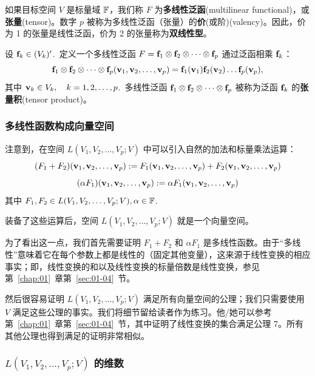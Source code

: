 如果目标空间 $V$ 是标量域 $\mathbb{F}$，我们称 $F$ 为\textbf{多线性泛函}(multilinear functional)，或\textbf{张量}(tensor)。数字 $p$ 被称为多线性泛函（张量）的\textbf{价}(或阶)(valency)。因此，价为 1 的张量是线性泛函，价为 2 的张量称为\textbf{双线性型}。

\begin{example*}
设 $\mathbf{f}_k \in (V_k)'$.~定义一个多线性泛函 $F = \mathbf{f}_1 \otimes \mathbf{f}_2 \otimes \dots \otimes \mathbf{f}_p$ 通过泛函相乘 $\mathbf{f}_k$：
\begin{equation}\label{eq:08-05-01}
\mathbf{f}_1 \otimes \mathbf{f}_2 \otimes \dots \otimes \mathbf{f}_p (\mathbf{v}_1, \mathbf{v}_2, \dots, \mathbf{v}_p) = \mathbf{f}_1(\mathbf{v}_1) \mathbf{f}_2(\mathbf{v}_2) \dots \mathbf{f}_p(\mathbf{v}_p),
\end{equation}
其中 $\mathbf{v}_k \in V_k,\quad k = 1, 2, \dots, p$.~多线性泛函 $\mathbf{f}_1 \otimes \mathbf{f}_2 \otimes \dots \otimes \mathbf{f}_p$ 被称为泛函 $\mathbf{f}_k$ 的\textbf{张量积}(tensor product)。
\end{example*}

\subsubsection{多线性函数构成向量空间}\label{sec:08-05-01-01}

注意到，在空间 $L(V_1, V_2, \dots, V_p; V)$ 中可以引入自然的加法和标量乘法运算：
$$ (F_1 + F_2)(\mathbf{v}_1, \mathbf{v}_2, \dots, \mathbf{v}_p) := F_1(\mathbf{v}_1, \mathbf{v}_2, \dots, \mathbf{v}_p) + F_2(\mathbf{v}_1, \mathbf{v}_2, \dots, \mathbf{v}_p) $$
$$ (\alpha F_1)(\mathbf{v}_1, \mathbf{v}_2, \dots, \mathbf{v}_p) := \alpha F_1(\mathbf{v}_1, \mathbf{v}_2, \dots, \mathbf{v}_p) $$
其中 $F_1, F_2 \in L(V_1, V_2, \dots, V_p; V), \alpha \in \mathbb{F}$.~

装备了这些运算后，空间 $L(V_1, V_2, \dots, V_p; V)$ 就是一个向量空间。

为了看出这一点，我们首先需要证明 $F_1 + F_2$ 和 $\alpha F_1$ 是多线性函数。由于“多线性”意味着它在每个参数上都是线性的（固定其他变量），这来源于线性变换的相应事实；即，线性变换的和以及线性变换的标量倍数是线性变换，参见第~\ref{chap:01}~章第~\ref{sec:01-04}~节。

然后很容易证明 $L(V_1, V_2, \dots, V_p; V)$ 满足所有向量空间的公理；我们只需要使用 $V$ 满足这些公理的事实。我们将细节留给读者作为练习。他/她可以参考第~\ref{chap:01}~章第~\ref{sec:01-04}~节，其中证明了线性变换的集合满足公理 7。所有其他公理也得到满足的证明非常相似。

\subsubsection{\texorpdfstring{$L(V_1, V_2, \dots, V_p; V)$ 的维数}{多线性映射空间的维数}}\label{sec:08-05-01-02}

